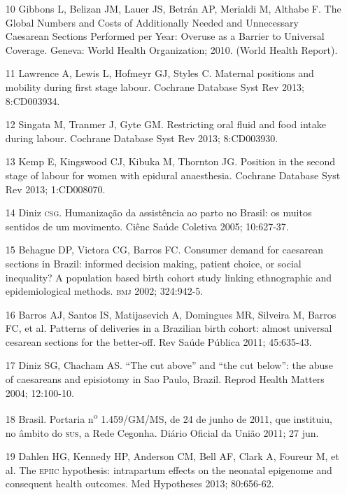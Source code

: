 \documentclass{article}
\begin{document}
\begin{itemize}
\item[10] Gibbons L, Belizan JM, Lauer JS, Betrán AP, Merialdi M, Althabe F.
The Global Numbers and Costs of Additionally Needed and Unnecessary Caesarean
Sections Performed per Year: Overuse as a Barrier to Universal Coverage. Geneva:
World Health Organization; 2010. (World Health Report).

\item[11] Lawrence A, Lewis L, Hofmeyr GJ, Styles C. Maternal positions and
mobility during first stage labour. Cochrane Database Syst Rev 2013;
8:CD003934.

\item[12] Singata M, Tranmer J, Gyte GM. Restricting oral fluid and food
intake during labour. Cochrane Database Syst Rev 2013;
8:CD003930.

\item[13] Kemp E, Kingswood CJ, Kibuka M, Thornton JG. Position in the
second stage of labour for women with epidural anaesthesia. Cochrane Database
Syst Rev 2013; 1:CD008070.

\item[14] Diniz \textsc{csg}. Humanização da assistência ao parto no Brasil: os
muitos sentidos de um movimento. Ciênc Saúde Coletiva 2005;
10:627-37.

\item[15] Behague DP, Victora CG, Barros FC. Consumer demand for caesarean
sections in Brazil: informed decision making, patient choice, or social
inequality? A population based birth cohort study linking ethnographic and
epidemiological methods. \textsc{bmj} 2002; 324:942-5.

\item[16] Barros AJ, Santos IS, Matijasevich A, Domingues MR, Silveira M,
Barros FC, et al. Patterns of deliveries in a Brazilian birth cohort: almost
universal cesarean sections for the better-off. Rev Saúde Pública 2011;
45:635-43.

\item[17] Diniz SG, Chacham AS. “The cut above” and “the cut below”: the
abuse of caesareans and episiotomy in Sao Paulo, Brazil. Reprod Health Matters
2004; 12:100-10.

\item[18] Brasil. Portaria n\textsuperscript{o}
1.459/GM/MS,
de 24 de junho de 2011, que instituiu, no âmbito do \textsc{sus}, a Rede Cegonha. Diário
Oficial da União 2011; 27 jun.

\item[19] Dahlen HG, Kennedy HP, Anderson CM, Bell AF, Clark A, Foureur M,
et al. The \textsc{epiic} hypothesis: intrapartum effects on the neonatal epigenome and
consequent health outcomes. Med Hypotheses 2013; 80:656-62.


\end{itemize}
\end{document}
